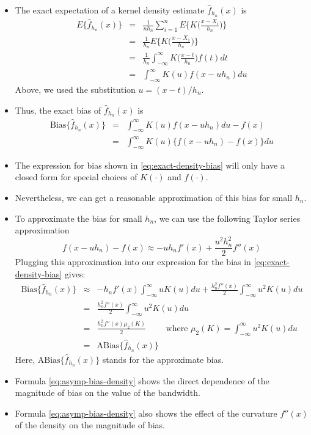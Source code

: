\documentclass[]{book}
\begin{document}
\begin{itemize}
\item
  The exact expectation of a kernel density estimate \(\hat{f}_{h_{n}}(x)\) is
  \begin{eqnarray}
  E\{ \hat{f}_{h_{n}}(x) \}
  &=& \frac{1}{nh_{n}} \sum_{i=1}^{n} E\Big\{ K\Big( \frac{x - X_{i}}{h_{n}} \Big) \Big\} \nonumber \\
  &=& \frac{1}{h_{n}} E\Big\{ K\Big( \frac{x - X_{1}}{h_{n}} \Big) \Big\} \nonumber \\
  &=& \frac{1}{h_{n}} \int_{-\infty}^{\infty} K\Big( \frac{x - t}{h_{n}} \Big) f(t) dt \nonumber \\
  &=&  \int_{-\infty}^{\infty} K( u ) f(x - uh_{n}) du \nonumber 
  \end{eqnarray}
  Above, we used the substitution \(u = (x - t)/h_{n}\).
\item
  Thus, the exact bias of \(\hat{f}_{h_{n}}(x)\) is
  \begin{eqnarray}
  \textrm{Bias}\{ \hat{f}_{h_{n}}(x) \}
  &=& \int_{-\infty}^{\infty} K( u ) f(x - uh_{n}) du - f(x)  \nonumber \\
  &=& \int_{-\infty}^{\infty} K( u ) \{ f(x - uh_{n}) - f(x) \} du 
  \label{eq:exact-density-bias}
  \end{eqnarray}
\item
  The expression for bias shown in \eqref{eq:exact-density-bias} will only
  have a closed form for special choices of \(K(\cdot)\) and \(f( \cdot )\).
\item
  Nevertheless, we can get a reasonable approximation of this bias for small \(h_{n}\).
\item
  To approximate the bias for small \(h_{n}\), we can use the following Taylor series approximation
  \begin{equation}
  f(x - uh_{n}) - f(x) \approx -uh_{n}f'(x) + \frac{u^{2}h_{n}^{2}}{2} f''(x) \nonumber 
  \end{equation}
  Plugging this approximation into our expression for the bias in \eqref{eq:exact-density-bias} gives:
  \begin{eqnarray}
  \textrm{Bias}\{ \hat{f}_{h_{n}}(x) \}
  &\approx&  -h_{n}f'(x) \int_{-\infty}^{\infty} u K( u )  du + \frac{h_{n}^{2}f''(x)}{2} \int_{-\infty}^{\infty} u^{2} K( u ) du  \nonumber \\
  &=& \frac{h_{n}^{2}f''(x)}{2} \int_{-\infty}^{\infty} u^{2} K( u ) du \nonumber \\
  &=& \frac{h_{n}^{2}f''(x)\mu_{2}(K)}{2} \qquad \textrm{ where } \mu_{2}(K) = \int_{-\infty}^{\infty} u^{2} K( u ) du \nonumber \\
  &=& \textrm{ABias}\{ \hat{f}_{h_{n}}(x) \} 
  \label{eq:asymp-bias-density}
  \end{eqnarray}
  Here, \(\textrm{ABias}\{ \hat{f}_{h_{n}}(x) \}\) stands for the approximate bias.
\item
  Formula \eqref{eq:asymp-bias-density} shows the direct dependence of the magnitude of bias on
  the value of the bandwidth.
\item
  Formula \eqref{eq:asymp-bias-density} also shows the effect of the curvature \(f''(x)\)
  of the density on the magnitude of bias.
\end{itemize}
\end{document}
